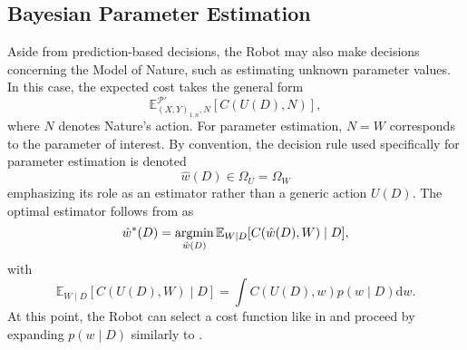\subsection{Bayesian Parameter Estimation}
Aside from prediction-based decisions, the Robot may also make decisions concerning the Model of Nature, such as estimating unknown parameter values. In this case, the expected cost takes the general form
\begin{equation}
	\mathbb{E}_{(X,Y)_{1\colon n}, N}^{\mathcal{P}'}[C(U(D), N)],
	\label{eq:expcost_nature}
\end{equation}
where $N$ denotes Nature's action. For parameter estimation, $N = W$ corresponds to the parameter of interest. By convention, the decision rule used specifically for parameter estimation is denoted
\begin{equation}
	\hat{w}(D) \in \Omega_U = \Omega_W
\end{equation}
emphasizing its role as an estimator rather than a generic action $U(D)$. The optimal estimator follows from  as
\begin{equation}
	\hat{w}^*(D)
	= \operatorname*{argmin}_{\hat{w}(D)} \mathbb{E}_{W\mid D}[C(\hat{w}(D), W)\mid D],
	\label{eq:param_decision}
\end{equation}
with
\begin{equation}
	\mathbb{E}_{W\mid D}[C(U(D), W)\mid D] = \int C(U(D),w)p(w\mid D) \mathrm{d}w.
\end{equation}
At this point, the Robot can select a cost function like in  and proceed by expanding $p(w\mid D)$ similarly to .


